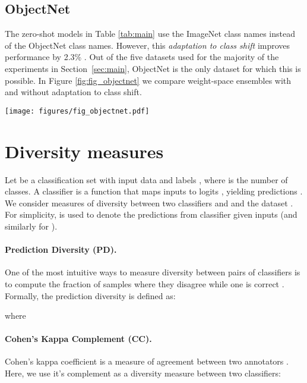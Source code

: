 \subsection{ObjectNet}\label{sec:objectnet}

The zero-shot models in Table \ref{tab:main} use the ImageNet class names instead of the ObjectNet class names. However, this \textit{adaptation to class shift} improves performance by 2.3\% \cite{radford2021learning}. Out of the five datasets used for the majority of the experiments in Section~\ref{sec:main}, ObjectNet is the only dataset for which this is possible. In Figure \ref{fig:fig_objectnet} we compare weight-space ensembles with and without adaptation to class shift.

\begin{figure*}
    \centering
    \texttt{[image: figures/fig\_objectnet.pdf]}
    \caption{Effective robustness scatter plots for ObjectNet, with and without adapting to class shift. \textbf{Left:} Using ImageNet class names to construct the zero-shot classifier. \textbf{Right:} Using ObjectNet class names to construct the zero-shot classifier.}
    \label{fig:fig_objectnet}
\end{figure*}




\section{Diversity measures}
\label{sec:diversity_defs}

Let  be a classification set with input data  and labels , where  is the number of classes. A classifier  is a function that maps inputs  to logits , yielding predictions . We consider measures of diversity  between two classifiers  and  and the dataset . For simplicity,  is used to denote the predictions from classifier  given inputs  (and similarly for ).

\paragraph{Prediction Diversity (PD).} One of the most intuitive ways to measure diversity between pairs of classifiers is to compute the fraction of samples where they disagree while one is correct \cite{ho1998random,skalak1996sources}. Formally, the prediction diversity  is defined as:

where




\paragraph{Cohen's Kappa Complement (CC).} Cohen's kappa coefficient is a measure of agreement between two annotators \cite{mchugh2012interrater}. Here, we use it's complement as a diversity measure between two classifiers:

